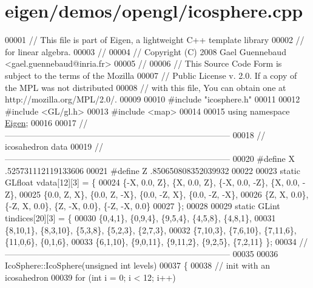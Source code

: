 \hypertarget{eigen_2demos_2opengl_2icosphere_8cpp_source}{}\section{eigen/demos/opengl/icosphere.cpp}
\label{eigen_2demos_2opengl_2icosphere_8cpp_source}

\begin{DoxyCode}
00001 \textcolor{comment}{// This file is part of Eigen, a lightweight C++ template library}
00002 \textcolor{comment}{// for linear algebra.}
00003 \textcolor{comment}{//}
00004 \textcolor{comment}{// Copyright (C) 2008 Gael Guennebaud <gael.guennebaud@inria.fr>}
00005 \textcolor{comment}{//}
00006 \textcolor{comment}{// This Source Code Form is subject to the terms of the Mozilla}
00007 \textcolor{comment}{// Public License v. 2.0. If a copy of the MPL was not distributed}
00008 \textcolor{comment}{// with this file, You can obtain one at http://mozilla.org/MPL/2.0/.}
00009 
00010 \textcolor{preprocessor}{#include "icosphere.h"}
00011 
00012 \textcolor{preprocessor}{#include <GL/gl.h>}
00013 \textcolor{preprocessor}{#include <map>}
00014 
00015 \textcolor{keyword}{using namespace }\hyperlink{namespace_eigen}{Eigen};
00016 
00017 \textcolor{comment}{//--------------------------------------------------------------------------------}
00018 \textcolor{comment}{// icosahedron data}
00019 \textcolor{comment}{//--------------------------------------------------------------------------------}
00020 \textcolor{preprocessor}{#define X .525731112119133606}
00021 \textcolor{preprocessor}{#define Z .850650808352039932}
00022 
00023 \textcolor{keyword}{static} GLfloat vdata[12][3] = \{
00024    \{-X, 0.0, Z\}, \{X, 0.0, Z\}, \{-X, 0.0, -Z\}, \{X, 0.0, -Z\},
00025    \{0.0, Z, X\}, \{0.0, Z, -X\}, \{0.0, -Z, X\}, \{0.0, -Z, -X\},
00026    \{Z, X, 0.0\}, \{-Z, X, 0.0\}, \{Z, -X, 0.0\}, \{-Z, -X, 0.0\}
00027 \};
00028 
00029 \textcolor{keyword}{static} GLint tindices[20][3] = \{
00030    \{0,4,1\}, \{0,9,4\}, \{9,5,4\}, \{4,5,8\}, \{4,8,1\},
00031    \{8,10,1\}, \{8,3,10\}, \{5,3,8\}, \{5,2,3\}, \{2,7,3\},
00032    \{7,10,3\}, \{7,6,10\}, \{7,11,6\}, \{11,0,6\}, \{0,1,6\},
00033    \{6,1,10\}, \{9,0,11\}, \{9,11,2\}, \{9,2,5\}, \{7,2,11\} \};
00034 \textcolor{comment}{//--------------------------------------------------------------------------------}
00035 
00036 IcoSphere::IcoSphere(\textcolor{keywordtype}{unsigned} \textcolor{keywordtype}{int} levels)
00037 \{
00038   \textcolor{comment}{// init with an icosahedron}
00039   \textcolor{keywordflow}{for} (\textcolor{keywordtype}{int} i = 0; i < 12; i++)

\end{DoxyCode}
